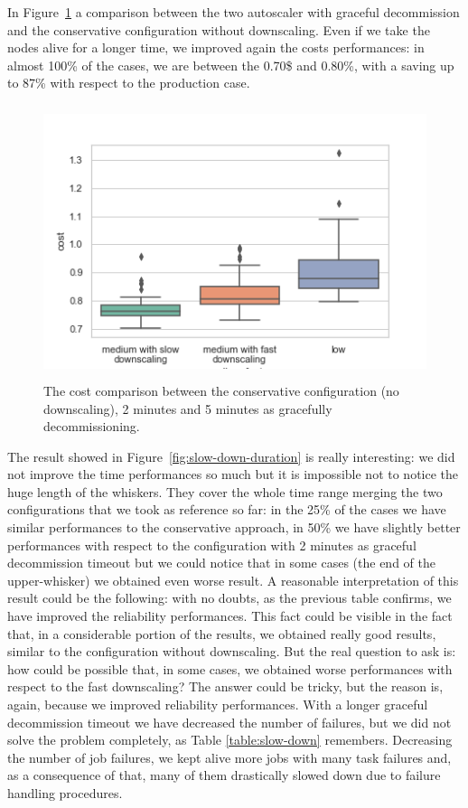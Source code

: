 \documentclass[12pt,twoside,cucitura]{toptesi}
\begin{document}
In Figure~\ref{fig:slow-down-cost} a comparison between the two autoscaler with graceful decommission and the conservative configuration without downscaling. Even if we take the nodes alive for a longer time, we improved again the costs performances: in almost 100\% of the cases, we are between the 0.70\$ and 0.80\%, with a saving up to 87\% with respect to the production case. 

\begin{figure}
\centering
\includegraphics[height=80mm]{slow-down-cost}
\caption{The cost comparison between the conservative configuration (no downscaling), 2 minutes and 5 minutes as gracefully decommissioning.}\label{fig:slow-down-cost}
\end{figure}

The result showed in Figure~\ref{fig:slow-down-duration} is really interesting: we did not improve the time performances so much but it is impossible not to notice the huge length of the whiskers. They cover the whole time range merging the two configurations that we took as reference so far: in the 25\% of the cases we have similar performances to the conservative approach, in 50\% we have slightly better performances with respect to the configuration with 2 minutes as graceful decommission timeout but we could notice that in some cases (the end of the upper-whisker) we obtained even worse result. A reasonable interpretation of this result could be the following: with no doubts, as the previous table confirms, we have improved the reliability performances. This fact could be visible in the fact that, in a considerable portion of the results, we obtained really good results, similar to the configuration without downscaling. But the real question to ask is: how could be possible that, in some cases, we obtained worse performances with respect to the fast downscaling? The answer could be tricky, but the reason is, again, because we improved reliability performances. With a longer graceful decommission timeout we have decreased the number of failures, but we did not solve the problem completely, as Table \ref{table:slow-down} remembers. Decreasing the number of job failures, we kept alive more jobs with many task failures and, as a consequence of that, many of them drastically slowed down due to failure handling procedures. 
\end{document}
